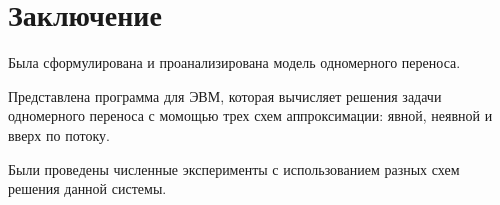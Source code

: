 \chapter{Заключение}
Была сформулирована и проанализирована модель одномерного переноса.

Представлена программа для ЭВМ, которая вычисляет решения задачи одномерного переноса с момощью трех схем аппроксимации: явной, неявной и вверх по потоку.

Были проведены численные эксперименты с использованием разных схем решения данной системы.